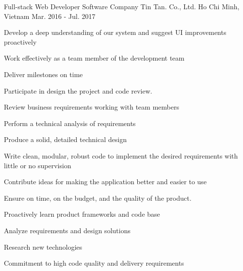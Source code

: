 \begin{cventries}
  \cventry
    {Full-stack Web Developer} %
    {Software Company Tin Tan. Co., Ltd.} %
    {Ho Chi Minh, Vietnam} %
    {Mar. 2016 - Jul. 2017} %
    {
      \begin{cvitems} %
        \item {Develop a deep understanding of our system and suggest UI improvements proactively}
        \item {Work effectively as a team member of the development team}
        \item {Deliver milestones on time}
        \item {Participate in design the project and code review.}
        \item {Review business requirements working with team members}
        \item {Perform a technical analysis of requirements}
        \item {Produce a solid, detailed technical design}
        \item {Write clean, modular, robust code to implement the desired requirements with little or no supervision}
        \item {Contribute ideas for making the application better and easier to use}
        \item {Ensure on time, on the budget, and the quality of the product.}
        \item {Proactively learn product frameworks and code base}
        \item {Analyze requirements and design solutions}
        \item {Research new technologies}
        \item {Commitment to high code quality and delivery requirements}
      \end{cvitems}
    }

\end{cventries}
